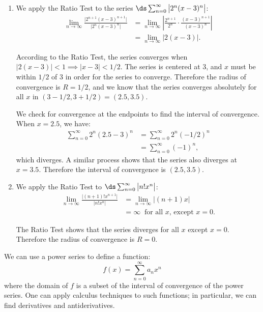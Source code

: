 {\begin{enumerate}
	\item		We apply the Ratio Test to the series $\ds\sum_{n=0}^\infty \big|2^n(x-3)^n\big|$:
	\begin{align*}
	\lim_{n\to\infty} \frac{\big| 2^{n+1}(x-3)^{n+1}\big|}{\big|2^n(x-3)^n\big|} &= \lim_{n\to\infty} \left|\frac{2^{n+1}}{2^n}\cdot\frac{(x-3)^{n+1}}{(x-3)^n}\right|\\
			&=\lim_{n\to\infty} \big|2(x-3)\big|.
	\end{align*}
	
According to the Ratio Test, the series converges when $\big|2(x-3)\big|<1 \implies \big|x-3\big| < 1/2$. The series is centered at 3, and $x$ must be within $1/2$ of 3 in order for the series to converge. Therefore the radius of convergence is $R=1/2$, and we know that the series converges absolutely for all $x$ in $(3-1/2,3+1/2) = (2.5, 3.5)$.

We check for convergence at the endpoints to find the interval of convergence. When $x=2.5$, we have:
\begin{align*}
\sum_{n=0}^\infty 2^n(2.5-3)^n &= \sum_{n=0}^\infty 2^n(-1/2)^n \\
			&=\sum_{n=0}^\infty (-1)^n,
\end{align*}
which diverges. A similar process shows that the series also diverges at $x=3.5$. Therefore the interval of convergence is $(2.5, 3.5)$.

\item		We apply the Ratio Test to $\ds \sum_{n=0}^\infty \big|n!x^n\big|$:
\begin{align*}
\lim_{n\to\infty} \frac{\big| (n+1)!x^{n+1}\big|}{\big|n!x^n\big|} &= \lim_{n\to\infty} \big|(n+1)x\big|\\
		&= \infty\ \text{ for all $x$, except $x=0$.}
\end{align*}

The Ratio Test shows that the series diverges for all $x$ except $x=0$. Therefore the radius of convergence is $R=0$.\eoehere
\end{enumerate}}

We can use a power series to define a function:
$$f(x) = \sum_{n=0}^\infty a_nx^n$$
where the domain of $f$ is a subset of the interval of convergence of the power series. One can apply calculus techniques to such functions; in particular, we can find derivatives and antiderivatives. 

